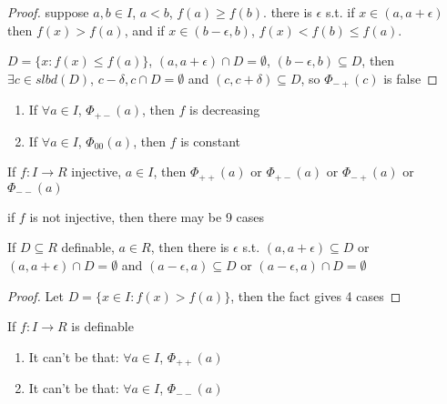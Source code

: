 \documentclass[11pt]{article}
\begin{document}
\begin{proof}
suppose \(a,b\in I\), \(a<b\), \(f(a)\ge f(b)\). there is \(\epsilon\) s.t.
if \(x\in(a,a+\epsilon)\) then \(f(x)>f(a)\), and if \(x\in(b-\epsilon,b)\), \(f(x)<f(b)\le f(a)\).

\(D=\{x:f(x)\le f(a)\}\), \((a,a+\epsilon)\cap D=\emptyset\), \((b-\epsilon,b)\subseteq D\), then \(\exists c\in slbd(D)\), \(c-\delta,c\cap D=\emptyset\)
and \((c,c+\delta)\subseteq D\), so \(\Phi_{-+}(c)\) is false
\end{proof}

\begin{lemma}[]
\begin{enumerate}
\item If \(\forall a\in I\), \(\Phi_{+-}(a)\), then \(f\) is decreasing
\item If \(\forall a\in I\),  \(\Phi_{00}(a)\), then \(f\) is constant
\end{enumerate}
\end{lemma}

\begin{lemma}[]
If \(f:I\to R\) injective, \(a\in I\), then \(\Phi_{++}(a)\) or \(\Phi_{+-}(a)\) or \(\Phi_{-+}(a)\) or \(\Phi_{--}(a)\)
\end{lemma}

if \(f\) is not injective, then there may be 9 cases

\begin{fact}[]
If \(D\subseteq R\) definable, \(a\in R\), then there is \(\epsilon\) s.t. \((a,a+\epsilon)\subseteq D\) or \((a,a+\epsilon)\cap D=\emptyset\) and
\((a-\epsilon,a)\subseteq D\) or \((a-\epsilon,a)\cap D=\emptyset\)
\end{fact}

\begin{proof}
Let \(D=\{x\in I:f(x)>f(a)\}\), then the fact gives 4 cases
\end{proof}

\begin{lemma}[]
\label{w3.4}
If \(f:I\to R\) is definable
\begin{enumerate}
\item It can't be that: \(\forall a\in I\), \(\Phi_{++}(a)\)
\item It can't be that: \(\forall a\in I\), \(\Phi_{--}(a)\)
\end{enumerate}
\end{lemma}
\end{document}
